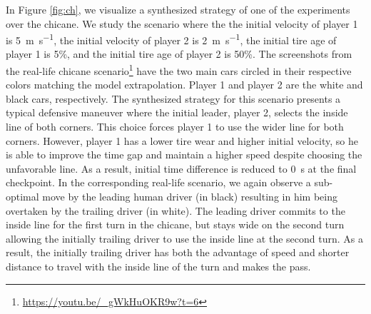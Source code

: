 In Figure \ref{fig:ch}, we visualize a synthesized strategy of one of the experiments over the chicane. We study the scenario where the the initial velocity of player 1 is \SI{5}{\meter\per\second}, the initial velocity of player 2 is \SI{2}{\meter\per\second}, the initial tire age of player 1 is 5\%, and the initial tire age of player 2 is 50\%. The screenshots from the real-life chicane scenario\footnote{\label{chicanenote}\url{https://youtu.be/_gWkHuOKR9w?t=6}} have the two main cars circled in their respective colors matching the model extrapolation. Player 1 and player 2 are the white and black cars, respectively. The synthesized strategy for this scenario presents a typical defensive maneuver where the initial leader, player 2, selects the inside line of both corners. This choice forces player 1 to use the wider line for both corners. However, player 1 has a lower tire wear and higher initial velocity, so he is able to improve the time gap and maintain a higher speed despite choosing the unfavorable line. As a result, initial time difference is reduced to \SI{0}{\second} at the final checkpoint. In the corresponding real-life scenario, we again observe a sub-optimal move by the leading human driver (in black) resulting in him being overtaken by the trailing driver (in white). The leading driver commits to the inside line for the first turn in the chicane, but stays wide on the second turn allowing the initially trailing driver to use the inside line at the second turn. As a result, the initially trailing driver has both the advantage of speed and shorter distance to travel with the inside line of the turn and makes the pass.  

\FloatBarrier
